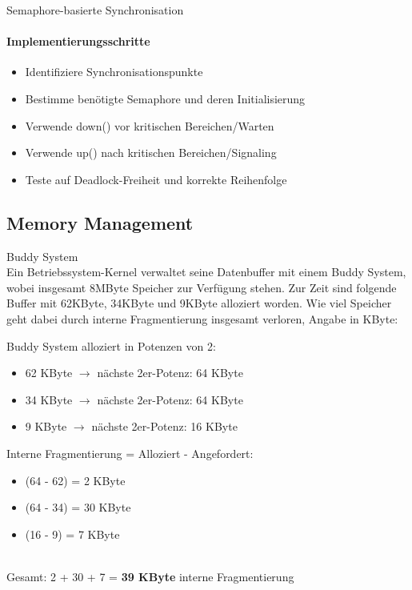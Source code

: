 \begin{KR}{Semaphore-basierte Synchronisation}
    \paragraph{Implementierungsschritte}
    \begin{itemize}
        \item Identifiziere Synchronisationspunkte
        \item Bestimme benötigte Semaphore und deren Initialisierung
        \item Verwende down() vor kritischen Bereichen/Warten
        \item Verwende up() nach kritischen Bereichen/Signaling
        \item Teste auf Deadlock-Freiheit und korrekte Reihenfolge
    \end{itemize}
\end{KR}

\subsection{Memory Management}

\begin{example2}{Buddy System}\\
    Ein Betriebssystem-Kernel verwaltet seine Datenbuffer mit einem Buddy System, wobei insgesamt 8MByte Speicher zur Verfügung stehen. Zur Zeit sind folgende Buffer mit 62KByte, 34KByte und 9KByte alloziert worden. Wie viel Speicher geht dabei durch interne Fragmentierung insgesamt verloren, Angabe in KByte:
    
    \tcblower
    \begin{minipage}{0.5\linewidth}
    Buddy System alloziert in Potenzen von 2:
    
    \begin{itemize}
        \item 62 KByte $\rightarrow$ nächste 2er-Potenz: 64 KByte
        \item 34 KByte $\rightarrow$ nächste 2er-Potenz: 64 KByte  
        \item 9 KByte $\rightarrow$ nächste 2er-Potenz: 16 KByte
    \end{itemize}
    \end{minipage}
    \begin{minipage}{0.5\linewidth}
    Interne Fragmentierung = Alloziert - Angefordert:
    \begin{itemize}
        \item (64 - 62) = 2 KByte
        \item (64 - 34) = 30 KByte
        \item (16 - 9) = 7 KByte
    \end{itemize}
    \end{minipage}
    \vspace{2mm}\\
    Gesamt: 2 + 30 + 7 = \textbf{39 KByte} interne Fragmentierung
\end{example2}

